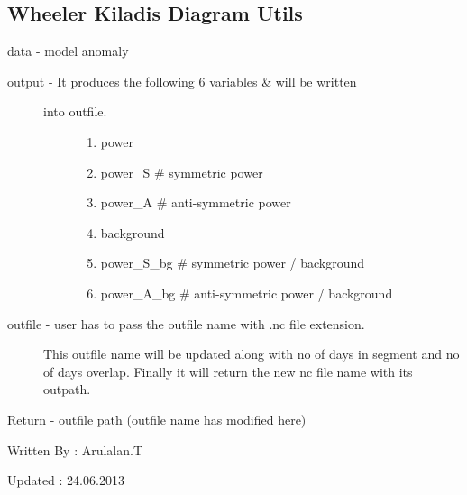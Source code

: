 \documentclass[letterpaper,10pt,english]{sphinxmanual}
\begin{document}
\subsection{Wheeler Kiladis Diagram Utils}
\label{mjo:wheeler-kiladis-diagram-utils}\label{mjo:module-wk_utils}

\begin{fulllineitems}
\label{mjo:wk_utils.genWKVars}
data - model anomaly
\begin{description}
\item[{output - It produces the following 6 variables \& will be written}] \leavevmode\begin{description}
\item[{into outfile.}] \leavevmode\begin{enumerate}
\item {} 
power

\item {} 
power\_S  \# symmetric power

\item {} 
power\_A  \# anti-symmetric power

\item {} 
background

\item {} 
power\_S\_bg  \# symmetric power / background

\item {} 
power\_A\_bg  \# anti-symmetric power / background

\end{enumerate}

\end{description}

\item[{outfile - user has to pass the outfile name with .nc file extension.}] \leavevmode
This outfile name will be updated along with no of days in
segment and no of days overlap. Finally it will return the
new nc file name with its outpath.

\end{description}

Return - outfile path (outfile name has modified here)

Written By : Arulalan.T

Updated : 24.06.2013

\end{fulllineitems}
\end{document}
